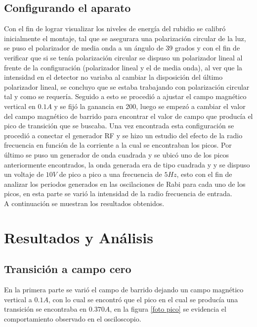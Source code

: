 \documentclass[%
 reprint,
 amsmath,amssymb,
 aps,
]{revtex4-1}
\begin{document}
\subsection{Configurando el aparato}
Con el fin de lograr visualizar los niveles de energía del rubidio se calibró inicialmente el montaje, tal que se asegurara una polarización circular de la luz, se puso el polarizador de media onda a un ángulo de 39 grados y con el fin de verificar que si se tenía polarización circular se dispuso un polarizador lineal al frente de la configuración (polarizador lineal y el de media onda), al ver que la intensidad en el detector no variaba al cambiar la disposición del último polarizador lineal, se concluyo que se estaba trabajando con polarización circular tal y como se requería. Seguido a esto se procedió a ajustar el campo magnético vertical en $0.1A$ y se fijó la ganancia en 200, luego se empezó a cambiar el valor del campo magnético de barrido para encontrar el valor de campo que producía el pico de transición que se buscaba. Una vez encontrada esta configuración se procedió a conectar el generador RF y se hizo un estudio del efecto de la radio frecuencia en función de la corriente a la cual se encontraban los picos. Por último se puso un generador de onda cuadrada y se ubicó uno de los picos anteriormente encontrados, la onda generada era de tipo cuadrada y y se dispuso un voltaje de $10V$ de pico a pico a una frecuencia de $5Hz$, esto con el fin de analizar los periodos generados en las oscilaciones de Rabi para cada uno de los picos, en esta parte se varió la intensidad de la radio frecuencia de entrada.\\
A continuación se muestran los resultados obtenidos.


\section{Resultados y Análisis}
\subsection{Transición a campo cero}
En la primera parte se varió el campo de barrido dejando un campo magnético vertical a $0.1 A$, con lo cual se encontró que el pico en el cual se producía una transición se encontraba en $0.370A$, en la figura \ref{foto pico} se evidencia el comportamiento observado en el osciloscopio.
\end{document}
